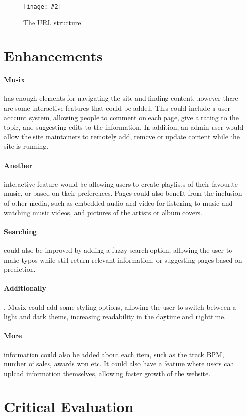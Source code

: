 \documentclass[10pt, a4paper]{article}
\newcommand{\figuremacro}[5]{
    \begin{figure}[#1]
        \centering
        \texttt{[image: \#2]}
        \caption[#3]{\textbf{#3}#4}
        \label{fig:#2}
    \end{figure}
}
\begin{document}
    \figuremacro{H}{images/URL.png}{}{The URL structure}{1.0}
    
    \section{Enhancements}
    \paragraph{Musix} has enough elements for navigating the site and finding content, however there are some interactive features that could be added. This could include a user account system, allowing people to comment on each page, give a rating to the topic, and suggesting edits to the information. In addition, an admin user would allow the site maintainers to remotely add, remove or update content while the site is running.
    \paragraph{Another} interactive feature would be allowing users to create playlists of their favourite music, or based on their preferences. Pages could also benefit from the inclusion of other media, such as embedded audio and video for listening to music and watching music videos, and pictures of the artists or album covers.
    \paragraph{Searching} could also be improved by adding a fuzzy search option, allowing the user to make typos while still return relevant information, or suggesting pages based on prediction.
    \paragraph{Additionally}, Musix could add some styling options, allowing the user to switch between a light and dark theme, increasing readability in the daytime and nighttime.
    \paragraph{More} information could also be added about each item, such as the track BPM, number of sales, awards won etc. It could also have a feature where users can upload information themselves, allowing faster growth of the website.
    
    \section{Critical Evaluation}
\end{document}
